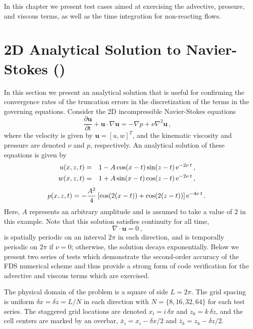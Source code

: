 \documentclass[11pt]{book}
\begin{document}
In this chapter we present test cases aimed at exercising the advective, pressure, and viscous terms, as well as the time integration for non-reacting flows.


\section{2D Analytical Solution to Navier-Stokes (\texorpdfstring{}{ns2d})}
\label{ns2d}

In this section we present an analytical solution that is useful for confirming the convergence rates of the truncation errors in the discretization of the terms in
the governing equations. Consider the 2D incompressible Navier-Stokes equations
\begin{equation}
\label{eqn_NS}
\frac{\partial \mathbf{u}}{\partial t} + \mathbf{u} \cdot \nabla \mathbf{u} = - \nabla{p} + \nu \nabla^2 \mathbf{u} \,\mbox{,}
\end{equation}
where the velocity is given by $\mathbf{u} = [u, w]^T$, and the kinematic viscosity and pressure are denoted $\nu$ and $p$, respectively.
An analytical solution of these equations is given by \cite{McDermott:NS2D}
\begin{eqnarray}
\label{eqn_usoln}
u(x,z,t) &=& 1 - A\cos(x-t)\sin(z-t)\,{\rm e}^{-2\nu\, t} \,\mbox{,} \\
w(x,z,t) &=& 1 + A\sin(x-t)\cos(z-t)\,{\rm e}^{-2\nu\, t} \,\mbox{,}
\end{eqnarray}
\begin{equation}
p(x,z,t) = -\frac{A^2}{4} \left[ \cos(2(x-t))+\cos(2(z-t))\right]{\rm e}^{-4\nu\, t} \,\mbox{.}
\end{equation}
Here, $A$ represents an arbitrary amplitude and is assumed to take a value of 2 in this example.
Note that this solution satisfies continuity for all time,
\begin{equation}
\label{eqn_divfree}
\nabla\cdot\mathbf{u} = 0 \,\mbox{,}
\end{equation}
is spatially periodic on an interval $2\pi$ in each direction, and is temporally periodic on $2\pi$ if $\nu=0$; otherwise, the solution decays exponentially.
Below we present two series of tests which demonstrate the second-order accuracy of the FDS numerical scheme and thus provide a strong form of code verification
for the advective and viscous terms which are exercised.

The physical domain of the problem is a square of side $L=2\pi$.  The grid spacing is uniform $\delta x = \delta z = L/N$ in each direction
with $N =\{8,16,32,64\}$ for each test series.  The staggered grid locations are denoted $x_i = i \, \delta x$ and $z_k = k \, \delta z$, and the cell
centers are marked by an overbar, $\bar{x}_i = x_i - \delta x/2$ and $\bar{z}_k = z_k - \delta z/2$.
\end{document}
